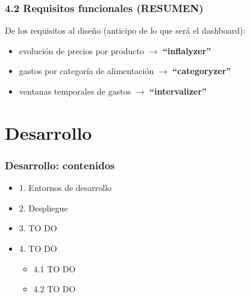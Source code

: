 \documentclass{beamer}
\begin{document}
		
		
								
			\begin{frame}
				\frametitle{4.2 Requisitos funcionales (RESUMEN)}
				
				
				De los requisitos al diseño (anticipo de lo que será el dashboard):
			
				\begin{itemize}
					\item evolución de precios por producto $\rightarrow$ \textbf{``inflalyzer''}
					\item gastos por categoría de alimentación $\rightarrow$  \textbf{``categoryzer''}
					\item ventanas temporales de gastos $\rightarrow$  \textbf{``intervalizer''}
				\end{itemize}
				
			\end{frame}
		
		
		
		
		
		
		
		
	\section{Desarrollo}
	
	
	
	
	
		
	\begin{frame}
		\frametitle{\textbf{Desarrollo}: contenidos}
		\begin{itemize}
			\item 1. Entornos de desarrollo
			\item 2. Despliegue
			\item 3. TO DO
			\item 4. TO DO
			\begin{itemize}
				\item 4.1 TO DO
				\item 4.2 TO DO
			\end{itemize}
		\end{itemize}
	\end{frame}
	
	
	
	
	
\end{document}
